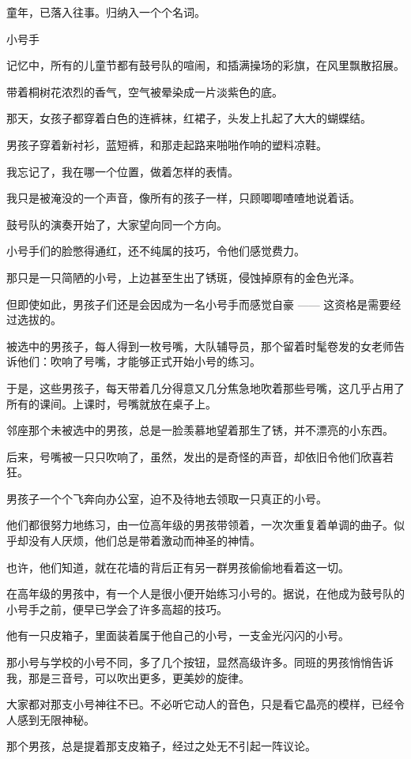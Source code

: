 \documentclass[12pt,a4paper]{article}
\newcommand{\subpart}[1]{
	\begingroup \par
	\vspace{1ex} \centering #1
	\par \endgroup
}
\begin{document}
		童年，已落入往事。归纳入一个个名词。

		\subpart{小号手}

		记忆中，所有的儿童节都有鼓号队的喧闹，和插满操场的彩旗，在风里飘散招展。\par
		带着桐树花浓烈的香气，空气被晕染成一片淡紫色的底。\par
		那天，女孩子都穿着白色的连裤袜，红裙子，头发上扎起了大大的蝴蝶结。\par
		男孩子穿着新衬衫，蓝短裤，和那走起路来啪啪作响的塑料凉鞋。

		我忘记了，我在哪一个位置，做着怎样的表情。\par
		我只是被淹没的一个声音，像所有的孩子一样，只顾唧唧喳喳地说着话。

		鼓号队的演奏开始了，大家望向同一个方向。\par
		小号手们的脸憋得通红，还不纯属的技巧，令他们感觉费力。

		那只是一只简陋的小号，上边甚至生出了锈斑，侵蚀掉原有的金色光泽。\par
		但即使如此，男孩子们还是会因成为一名小号手而感觉自豪 —— 这资格是需要经过选拔的。\par
		被选中的男孩子，每人得到一枚号嘴，大队辅导员，那个留着时髦卷发的女老师告诉他们：吹响了号嘴，才能够正式开始小号的练习。\par
		于是，这些男孩子，每天带着几分得意又几分焦急地吹着那些号嘴，这几乎占用了所有的课间。上课时，号嘴就放在桌子上。\par
		邻座那个未被选中的男孩，总是一脸羡慕地望着那生了锈，并不漂亮的小东西。

		后来，号嘴被一只只吹响了，虽然，发出的是奇怪的声音，却依旧令他们欣喜若狂。\par
		男孩子一个个飞奔向办公室，迫不及待地去领取一只真正的小号。

		他们都很努力地练习，由一位高年级的男孩带领着，一次次重复着单调的曲子。似乎却没有人厌烦，他们总是带着激动而神圣的神情。\par
		也许，他们知道，就在花墙的背后正有另一群男孩偷偷地看着这一切。

		在高年级的男孩中，有一个人是很小便开始练习小号的。据说，在他成为鼓号队的小号手之前，便早已学会了许多高超的技巧。\par
		他有一只皮箱子，里面装着属于他自己的小号，一支金光闪闪的小号。\par
		那小号与学校的小号不同，多了几个按钮，显然高级许多。同班的男孩悄悄告诉我，那是三音号，可以吹出更多，更美妙的旋律。\par
		大家都对那支小号神往不已。不必听它动人的音色，只是看它晶亮的模样，已经令人感到无限神秘。\par
		那个男孩，总是提着那支皮箱子，经过之处无不引起一阵议论。
\end{document}

